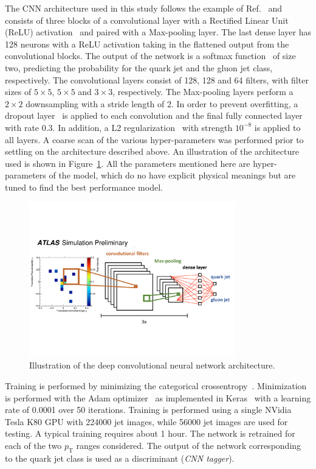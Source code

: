 The CNN architecture used in this study follows the example of Ref.~\cite{Komiske:2016rsd} and consists of three blocks of a convolutional layer with a
Rectified Linear Unit (ReLU) activation~\cite{RELU} and paired with a Max-pooling layer.
The last dense layer has 128 neurons with a ReLU activation taking in the flattened output from the convolutional blocks.
The output of the network is a softmax function~\cite{dlbook} of size two, 
predicting the probability for the quark jet and the gluon jet class, respectively. 
The convolutional layers consist of 128, 128 and 64 filters, with filter sizes of $5\times5$, $5\times5$ and $3\times3$, respectively.
The Max-pooling layers perform a $2\times2$ downsampling with a stride length of 2.
In order to prevent overfitting, a dropout layer~\cite{Goodfellow-et-al-2016-Book} is applied to each convolution and the final fully connected layer with rate 0.3.
In addition, a L2 regularization~\cite{Goodfellow-et-al-2016-Book} with strength $10^{-8}$ is applied to all layers.  
A coarse scan of the various hyper-parameters was performed prior to settling on the architecture described above.
An illustration of the architecture used is shown in Figure~\ref{fig:networkarch}. All the parameters mentioned here are hyper-parameters of the model, which do no have
explicit physical meanings but are tuned to find the best performance model. 

\begin{figure}[htpb]
\begin{center}
\includegraphics[width=0.8\textwidth]{figures/CNN/network.pdf}
\caption{Illustration of the deep convolutional neural network architecture.}
\label{fig:networkarch}
\end{center}
\end{figure}

Training is performed by minimizing the categorical crossentropy~\cite{Goodfellow-et-al-2016-Book}.
Minimization is performed with the Adam optimizer~\cite{DBLP:journals/corr/KingmaB14} 
as implemented in Keras~\cite{keras}
with a learning rate of 0.0001 over 50 iterations.
Training is performed using a single NVidia Tesla K80 GPU with 224000 jet images, while 56000 jet images are used for testing.
A typical training requires about 1 hour.
The network is retrained for each of the two $p_\text{T}$ ranges considered.
The output of the network corresponding to the quark jet class is used as a discriminant (\textit{CNN tagger}).
